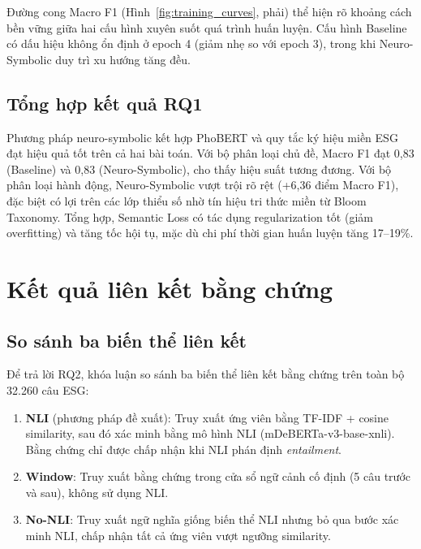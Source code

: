 Đường cong Macro F1 (Hình~\ref{fig:training_curves}, phải) thể hiện rõ khoảng cách bền vững giữa hai cấu hình xuyên suốt quá trình huấn luyện. Cấu hình Baseline có dấu hiệu không ổn định ở epoch 4 (giảm nhẹ so với epoch 3), trong khi Neuro-Symbolic duy trì xu hướng tăng đều.


\subsection{Tổng hợp kết quả RQ1}
\label{subsec:rq1_answer}

\begin{tcolorbox}[colback=gray!5, colframe=gray!60, title=Trả lời RQ1]
Phương pháp neuro-symbolic kết hợp PhoBERT và quy tắc ký hiệu miền ESG đạt hiệu quả tốt trên cả hai bài toán. Với bộ phân loại chủ đề, Macro F1 đạt 0,83 (Baseline) và 0,83 (Neuro-Symbolic), cho thấy hiệu suất tương đương. Với bộ phân loại hành động, Neuro-Symbolic vượt trội rõ rệt (+6,36 điểm Macro F1), đặc biệt có lợi trên các lớp thiểu số nhờ tín hiệu tri thức miền từ Bloom Taxonomy. Tổng hợp, Semantic Loss có tác dụng regularization tốt (giảm overfitting) và tăng tốc hội tụ, mặc dù chi phí thời gian huấn luyện tăng 17--19\%.
\end{tcolorbox}


\section{Kết quả liên kết bằng chứng}
\label{sec:evidence_results}

\subsection{So sánh ba biến thể liên kết}
\label{subsec:evidence_variants}

Để trả lời RQ2, khóa luận so sánh ba biến thể liên kết bằng chứng trên toàn bộ 32.260 câu ESG:

\begin{enumerate}
    \item \textbf{NLI} (phương pháp đề xuất): Truy xuất ứng viên bằng TF-IDF + cosine similarity, sau đó xác minh bằng mô hình NLI (mDeBERTa-v3-base-xnli). Bằng chứng chỉ được chấp nhận khi NLI phán định \textit{entailment}.
    \item \textbf{Window}: Truy xuất bằng chứng trong cửa sổ ngữ cảnh cố định (5 câu trước và sau), không sử dụng NLI.
    \item \textbf{No-NLI}: Truy xuất ngữ nghĩa giống biến thể NLI nhưng bỏ qua bước xác minh NLI, chấp nhận tất cả ứng viên vượt ngưỡng similarity.
\end{enumerate}

